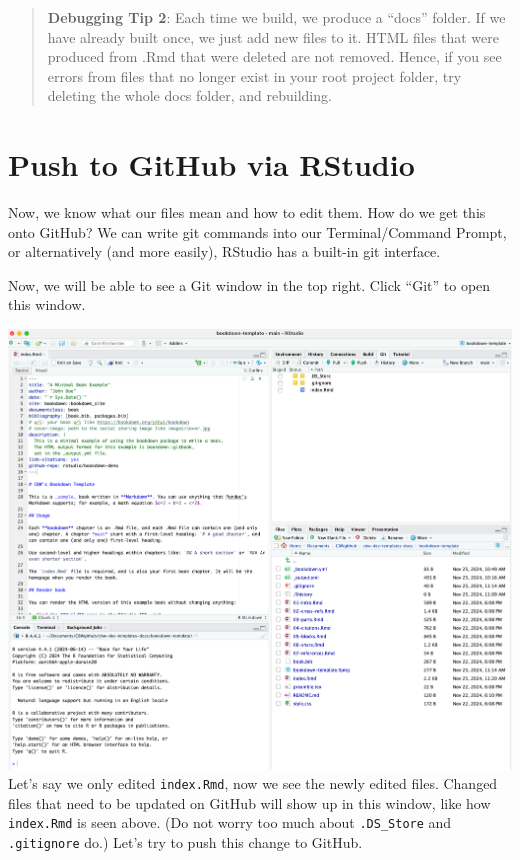 \documentclass[
]{book}
\theoremstyle{definition}
\theoremstyle{definition}
\theoremstyle{definition}
\theoremstyle{definition}
\theoremstyle{remark}
\begin{document}
\begin{quote}
\textbf{Debugging Tip 2}: Each time we build, we produce a ``docs'' folder. If we have already built once, we just add new files to it. HTML files that were produced from .Rmd that were deleted are not removed. Hence, if you see errors from files that no longer exist in your root project folder, try deleting the whole docs folder, and rebuilding.
\end{quote}

\section{Push to GitHub via RStudio}\label{push-to-github-via-rstudio}

Now, we know what our files mean and how to edit them. How do we get this onto GitHub? We can write git commands into our Terminal/Command Prompt, or alternatively (and more easily), RStudio has a built-in git interface.

Now, we will be able to see a Git window in the top right. Click ``Git'' to open this window.

\includegraphics{img/git-instruct/RStudio-with-git-window-open.png}\\

Let's say we only edited \texttt{index.Rmd}, now we see the newly edited files. Changed files that need to be updated on GitHub will show up in this window, like how \texttt{index.Rmd} is seen above. (Do not worry too much about \texttt{.DS\_Store} and \texttt{.gitignore} do.) Let's try to push this change to GitHub.
\end{document}
